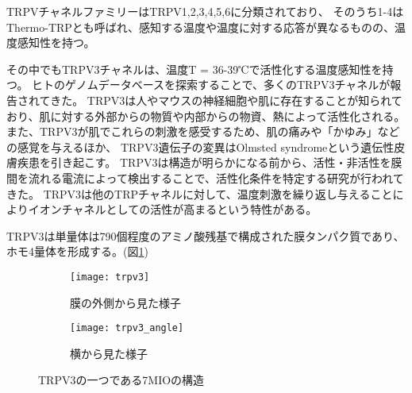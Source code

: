 TRPVチャネルファミリーはTRPV1,2,3,4,5,6に分類されており、
そのうち1-4はThermo-TRPとも呼ばれ、感知する温度や温度に対する応答が異なるものの、温度感知性を持つ。\autocite{baylie_trpv_2011}

その中でもTRPV3チャネルは、温度T = 36-39℃で活性化する温度感知性を持つ。\autocite{baylie_trpv_2011,xuTRPV3CalciumpermeableTemperaturesensitive2002}
ヒトのゲノムデータベースを探索することで、多くのTRPV3チャネルが報告されてきた。\autocite{smithTRPV3TemperaturesensitiveVanilloid2002, xuTRPV3CalciumpermeableTemperaturesensitive2002, peier_heat-sensitive_2002}
TRPV3は人やマウスの神経細胞や肌に存在することが知られており、肌に対する外部からの物質や内部からの物資、熱によって活性化される。%
また、TRPV3が肌でこれらの刺激を感受するため、肌の痛みや「かゆみ」などの感覚を与えるほか、
TRPV3遺伝子の変異はOlmsted syndromeという遺伝性皮膚疾患を引き起こす。\autocite{lin_exome_2012,lai-cheong_recurrent_2012,nilius_trpv_2013}
TRPV3は構造が明らかになる前から、活性・非活性を膜間を流れる電流によって検出することで、活性化条件を特定する研究が行われてきた。
\autocite{smithTRPV3TemperaturesensitiveVanilloid2002,xuTRPV3CalciumpermeableTemperaturesensitive2002,nadezhdinStructuralMechanismHeatinduced2021,chung_2-aminoethoxydiphenyl_2004}
TRPV3は他のTRPチャネルに対して、温度刺激を繰り返し与えることによりイオンチャネルとしての活性が高まるという特性がある。
\autocite{peier_heat-sensitive_2002,chung_2-aminoethoxydiphenyl_2004,liu_hysteresis_2011}

TRPV3は単量体は790個程度のアミノ酸残基で構成された膜タンパク質であり、ホモ4量体を形成する。(図\ref{fig:trpv3})

\begin{figure}
  \centering
  \begin{subfigure}{0.4\textwidth}
    \texttt{[image: trpv3]}
    \caption{膜の外側から見た様子}
    \label{fig:trpv3}
  \end{subfigure}
  \begin{subfigure}{0.4\textwidth}
    \texttt{[image: trpv3\_angle]}
    \caption{横から見た様子}
    \label{fig:trpv3_angle}
  \end{subfigure}
  \caption{TRPV3の一つである7MIOの構造}
  \label{fig:trpv3_structures}
\end{figure}

